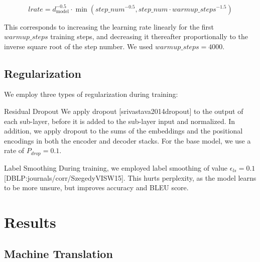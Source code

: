 \documentclass[11pt,a4paper]{article}
\begin{document}
$$\begin{equation}
lrate = d_{\text{model}}^{-0.5} \cdot
  \min({step\_num}^{-0.5},
    {step\_num} \cdot {warmup\_steps}^{-1.5})
\end{equation}$$

This corresponds to increasing the learning rate linearly for the first $warmup\_steps$ training steps, and decreasing it thereafter proportionally to the inverse square root of the step number.  We used $warmup\_steps=4000$.

\subsection{Regularization}

We employ three types of regularization during training:

Residual Dropout We apply dropout [srivastava2014dropout] to the output of each sub-layer, before it is added to the sub-layer input and normalized.   In addition, we apply dropout to the sums of the embeddings and the positional encodings in both the encoder and decoder stacks.  For the base model, we use a rate of $P_{drop}=0.1$.

Label Smoothing During training, we employed label smoothing of value $\epsilon_{ls}=0.1$ [DBLP:journals/corr/SzegedyVISW15].  This hurts perplexity, as the model learns to be more unsure, but improves accuracy and BLEU score.

\section{Results}

\subsection{Machine Translation}
\end{document}
